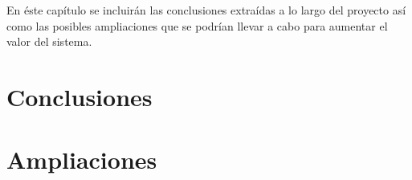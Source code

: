 En éste capítulo se incluirán las conclusiones extraídas a lo largo del proyecto así como las posibles ampliaciones que se podrían llevar a cabo para aumentar el valor del sistema.

\section{Conclusiones}
\label{conclusiones}


\section{Ampliaciones}
\label{ampliaciones}

